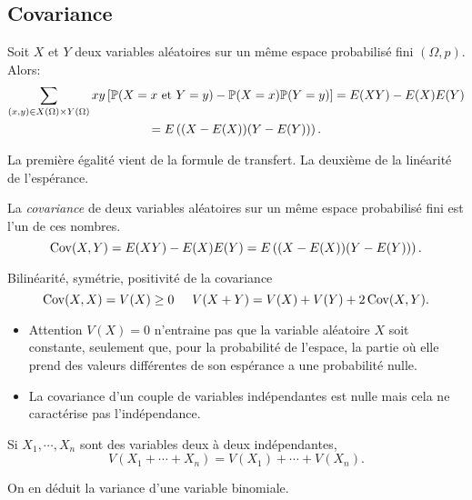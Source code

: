\subsection{Covariance}
\begin{prop}
 Soit $X$ et $Y$ deux variables aléatoires sur un même espace probabilisé fini $(\Omega,p)$.  Alors:
\begin{multline*}
 \sum_{(x,y)\in X(\Omega)\times Y(\Omega)}xy\left[ \mathbb{P}(X=x \text{ et } Y=y)-\mathbb{P}(X=x)\mathbb{P}(Y=y)\right] 
= E(XY) - E(X)E(Y)\\
=E\left((X-E(X))(Y-E(Y)) \right) .
\end{multline*}
\end{prop}
\begin{demo}
 La première égalité vient de la formule de transfert. La deuxième de la linéarité de l'espérance.
\end{demo}
\begin{defi}
 La \emph{covariance} de deux variables aléatoires sur un même espace probabilisé fini est l'un de ces nombres.
\begin{displaymath}
 \mathop{\mathrm{Cov}}(X,Y) = E(XY) - E(X)E(Y) = E\left((X-E(X))(Y-E(Y))\right) .
\end{displaymath}
\end{defi}
\begin{prop}
 Bilinéarité, symétrie, positivité de la covariance
\begin{displaymath}
 \mathop{\mathrm{Cov}}(X,X) = V(X)\geq 0 \hspace{0.5cm} V(X+Y)=V(X)+V(Y)+2\mathop{\mathrm{Cov}}(X,Y).
\end{displaymath}
\end{prop}
\begin{rems}
 \begin{itemize}
  \item Attention $V(X)=0$ n'entraine pas que la variable aléatoire $X$ soit constante, seulement que, pour la probabilité de l'espace, la partie où elle prend des valeurs différentes de son espérance a une probabilité nulle.
\item La covariance d'un couple de variables indépendantes est nulle mais cela ne caractérise pas l'indépendance.
 \end{itemize}
\end{rems}
\begin{prop}
 Si $X_1,\cdots,X_n$ sont des variables deux à deux indépendantes, 
\begin{displaymath}
 V(X_1+\cdots+X_n) = V(X_1)+\cdots+V(X_n).
\end{displaymath}
\end{prop}
On en déduit la variance d'une variable binomiale.

